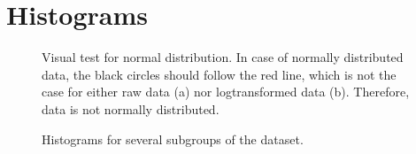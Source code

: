 \section{Histograms}


\begin{center}
	\begin{figure}[H]
		\caption[Testing normal distribution]{Visual test for normal distribution. In case of normally distributed data, the black circles should follow the red line, which is not the case for either raw data (a) nor logtransformed data (b). Therefore, data is not normally distributed.}
		\label{fig:NormDis}
	\end{figure}
\end{center}


\begin{center}
	\begin{figure}[H]
		\hfill %
		\caption[Additional histograms]{Histograms for several subgroups of the dataset.}
		\label{fig:HistRest}
	\end{figure}
\end{center}